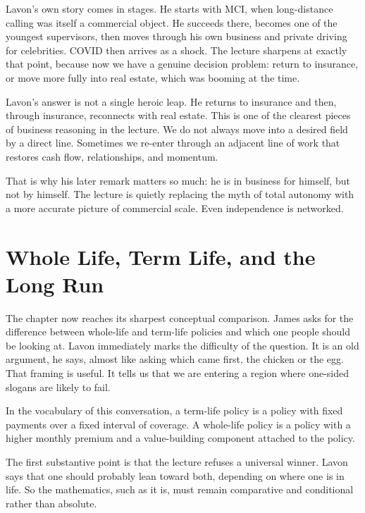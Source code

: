 Lavon's own story comes in stages. He starts with MCI, when long-distance calling was itself a commercial object. He succeeds there, becomes one of the youngest supervisors, then moves through his own business and private driving for celebrities. COVID then arrives as a shock. The lecture sharpens at exactly that point, because now we have a genuine decision problem: return to insurance, or move more fully into real estate, which was booming at the time.

Lavon's answer is not a single heroic leap. He returns to insurance and then, through insurance, reconnects with real estate. This is one of the clearest pieces of business reasoning in the lecture. We do not always move into a desired field by a direct line. Sometimes we re-enter through an adjacent line of work that restores cash flow, relationships, and momentum.

That is why his later remark matters so much: he is in business for himself, but not by himself. The lecture is quietly replacing the myth of total autonomy with a more accurate picture of commercial scale. Even independence is networked.

\section{Whole Life, Term Life, and the Long Run}

The chapter now reaches its sharpest conceptual comparison. James asks for the difference between whole-life and term-life policies and which one people should be looking at. Lavon immediately marks the difficulty of the question. It is an old argument, he says, almost like asking which came first, the chicken or the egg. That framing is useful. It tells us that we are entering a region where one-sided slogans are likely to fail.

\begin{definition}
In the vocabulary of this conversation, a term-life policy is a policy with fixed payments over a fixed interval of coverage. A whole-life policy is a policy with a higher monthly premium and a value-building component attached to the policy.
\end{definition}

The first substantive point is that the lecture refuses a universal winner. Lavon says that one should probably lean toward both, depending on where one is in life. So the mathematics, such as it is, must remain comparative and conditional rather than absolute.

